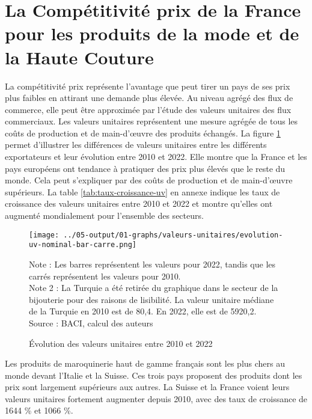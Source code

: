 \documentclass[french,10pt,a4paper]{article}
\begin{document}
\newpage
{}
\section{La Compétitivité prix de la France pour les produits de la mode et de la Haute Couture}
La compétitivité prix représente l'avantage que peut tirer un pays de ses prix plus faibles en attirant une demande plus élevée. Au niveau agrégé des flux de commerce, elle peut être approximée par l'étude des valeurs unitaires des flux commerciaux. Les valeurs unitaires représentent une mesure agrégée de tous les coûts de production et de main-d'œuvre des produits échangés. La figure \ref{fig:valeurs-unitaires} permet d'illustrer les différences de valeurs unitaires entre les différents exportateurs et leur évolution entre 2010 et 2022. Elle montre que la France et les pays européens ont tendance à pratiquer des prix plus élevés que le reste du monde. Cela peut s'expliquer par des coûts de production et de main-d'œuvre supérieurs. La table \ref{tab:taux-croissance-uv} en annexe indique les taux de croissance des valeurs unitaires entre 2010 et 2022 et montre qu'elles ont augmenté mondialement pour l'ensemble des secteurs.

\begin{figure}[!h]
  \centering
  \texttt{[image: ../05-output/01-graphs/valeurs-unitaires/evolution-uv-nominal-bar-carre.png]}
  \captionsetup{justification=justified, singlelinecheck=false, font=small}
  \caption*{Note : Les barres représentent les valeurs pour 2022, tandis que les carrés représentent les valeurs pour 2010. \\
  Note 2 : La Turquie a été retirée du graphique dans le secteur de la bijouterie pour des raisons de lisibilité. La valeur unitaire médiane de la Turquie en 2010 est de 80,4. En 2022, elle est de 5920,2. \\
  Source : BACI, calcul des auteurs}
  \captionsetup{justification=centering, singlelinecheck=true, font=normalsize}
  \caption{Évolution des valeurs unitaires entre 2010 et 2022}
  \label{fig:valeurs-unitaires}
\end{figure}


Les produits de maroquinerie haut de gamme français sont les plus chers au monde devant l'Italie et la Suisse. Ces trois pays proposent des produits dont les prix sont largement supérieurs aux autres. La Suisse et la France voient leurs valeurs unitaires fortement augmenter depuis 2010, avec des taux de croissance de 1644 \% et 1066 \%. 
\end{document}
